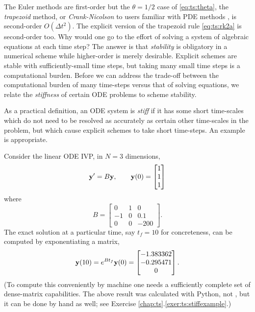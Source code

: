 The Euler methods are first-order but the $\theta=1/2$ case of \eqref{eq:ts:theta}, the \emph{trapezoid} method, or \emph{Crank-Nicolson} to users familiar with PDE methods \citep{MortonMayers2005}, is second-order $O(\Delta t^2)$.  The explicit version of the trapezoid rule \eqref{eq:ts:rk2a} is second-order too.  Why would one go to the effort of solving a system of algebraic equations at each time step?  The answer is that \emph{stability} is obligatory in a numerical scheme while higher-order is merely desirable.  Explicit schemes are stable with sufficiently-small time steps, but taking many small time steps is a computational burden.  Before we can address the trade-off between the computational burden of many time-steps versus that of solving equations, we relate the \emph{stiffness} of certain ODE problems to scheme stability.

As a practical definition, an ODE system is \emph{stiff} if it has some short time-scales which do not need to be resolved as accurately as certain other time-scales in the problem, but which cause explicit schemes to take short time-steps.  An example is appropriate.

\noindent\hrulefill
\begin{example}  \label{ex:ts:odestiff}  Consider the linear ODE IVP, in $N=3$ dimensions,
\begin{equation}
   \mathbf{y}' = B \mathbf{y}, \qquad \mathbf{y}(0) = \begin{bmatrix} 1 \\ 1 \\ 1 \end{bmatrix} \label{eq:ts:stiffexample}
\end{equation}
where
\begin{equation}
   B = \begin{bmatrix} 0 & 1 & 0 \\
                      -1 & 0 & 0.1 \\
                       0 & 0 & -200 \end{bmatrix}. \label{eq:ts:stiffexamplematrix}
\end{equation}
The exact solution at a particular time, say $t_f=10$ for concreteness, can be computed by exponentiating a matrix,
\begin{equation}
    \mathbf{y}(10) = e^{B t_f} \mathbf{y}(0) = \begin{bmatrix} -1.383362 \\
                                                 -0.295471 \\
                                                  0 \end{bmatrix}.\label{eq:ts:stiffsoln}
\end{equation}
(To compute this conveniently by machine one needs a sufficiently complete set of dense-matrix capabilities.  The above result was calculated with Python, not \PETSc, but it can be done by hand as well; see Exercise \ref{chap:ts}.\ref{exer:ts:stiffexample}.)
\end{example}
\noindent\hrulefill

